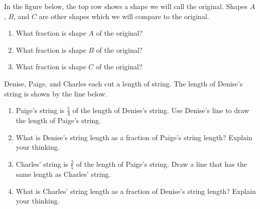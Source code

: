 \documentclass[nooutcomes, noauthor, handout]{ximera}
\begin{document}
\begin{problem} In the figure below, the top row shows a shape we will call the original.  Shapes $A$, $B$, and $C$ are other shapes which we will compare to the original. 
\begin{enumerate}
\item What fraction is shape $A$ of the original?
\item  What fraction is shape $B$ of the original?
\item What fraction is shape $C$ of the original?
\end{enumerate}

\begin{image}
\end{image}


\end{problem}

\begin{problem}

Denise, Paige, and Charles each cut a length of string. The length of Denise's string is shown by the line below. 
\begin{image} \end{image}
\vskip 1in
\begin{enumerate}
	\item Paige's string is $\frac{5}{4}$ of the length of Denise's string. Use Denise's line to draw the length of Paige's string.
	\item What is Denise's string length as a fraction of Paige's string length? Explain your thinking.
	\item Charles' string is $\frac{2}{5}$ of the length of Paige's string. Draw a line that has the same length as Charles' string.
	\item What is Charles' string length as a fraction of Denise's string length? Explain your thinking.
\end{enumerate}
\end{problem}
\end{document}
